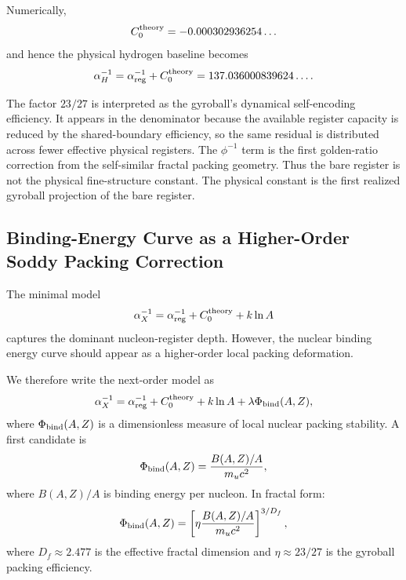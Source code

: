 \documentclass[11pt,a4paper]{article}
\begin{document}
    Numerically,
    \begin{equation}
    C_0^{\rm theory} = -0.000302936254\ldots
    \end{equation}
    and hence the physical hydrogen baseline becomes
    \begin{equation}
    \alpha_H^{-1}
    =
    \alpha_{\rm reg}^{-1}
    +
    C_0^{\rm theory}
    =
    137.036000839624\ldots .
    \end{equation}

    The factor \(23/27\) is interpreted as the gyroball's dynamical self-encoding efficiency. It appears in the denominator because the available register capacity is reduced by the shared-boundary efficiency, so the same residual is distributed across fewer effective physical registers. The \(\phi^{-1}\) term is the first golden-ratio correction from the self-similar fractal packing geometry. Thus the bare register is not the physical fine-structure constant. The physical constant is the first realized gyroball projection of the  bare register.


  \subsection{Binding-Energy Curve as a Higher-Order Soddy Packing Correction}

    The minimal model
    \begin{equation}
    \alpha_X^{-1}
    =
    \alpha_{\rm reg}^{-1}
    +
    C_0^{\rm theory}
    +
    k\ln A
    \end{equation}
    captures the dominant nucleon-register depth. However, the nuclear binding energy curve should appear as a higher-order local packing deformation.

    We therefore write the next-order model as
    \begin{equation}
    \alpha_X^{-1}
    =
    \alpha_{\rm reg}^{-1}
    +
    C_0^{\rm theory}
    +
    k\ln A
    +
    \lambda\Phi_{\rm bind}(A,Z),
    \end{equation}
    where \(\Phi_{\rm bind}(A,Z)\) is a dimensionless measure of local nuclear packing stability. A first candidate is
    \begin{equation}
    \Phi_{\rm bind}(A,Z)
    =
    \frac{B(A,Z)/A}{m_uc^2},
    \end{equation}
    where \(B(A,Z)/A\) is binding energy per nucleon. In fractal form:
    \begin{equation}
    \Phi_{\rm bind}(A,Z)
    =
    \left[
    \eta
    \frac{B(A,Z)/A}{m_uc^2}
    \right]^{3/D_f},
    \end{equation}
    where \(D_f\approx2.477\) is the effective fractal dimension and \(\eta\approx23/27\) is the gyroball packing efficiency.
\end{document}
